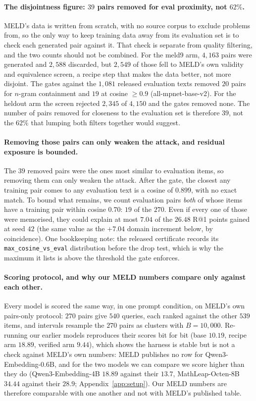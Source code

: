 \paragraph{The disjointness figure: $39$ pairs removed for eval proximity, not $62\%$.}MELD's data is written from scratch, with no source corpus to exclude problems from, so the only way to keep training data away from its evaluation set is to check each generated pair against it. That check is separate from quality filtering, and the two counts should not be combined. For the meld9 arm, $4{,}163$ pairs were generated and $2{,}588$ discarded, but $2{,}549$ of those fell to MELD's own validity and equivalence screen, a recipe step that makes the data better, not more disjoint. The gates against the $1{,}081$ released evaluation texts removed $20$ pairs for $n$-gram containment and $19$ at cosine $\ge 0.9$ (all-mpnet-base-v2). For the heldout arm the screen rejected $2{,}345$ of $4{,}150$ and the gates removed none. The number of pairs removed for closeness to the evaluation set is therefore $39$, not the $62\%$ that lumping both filters together would suggest.

\paragraph{Removing those pairs can only weaken the attack, and residual exposure is bounded.}The $39$ removed pairs were the ones most similar to evaluation items, so removing them can only weaken the attack. After the gate, the closest any training pair comes to any evaluation text is a cosine of $0.899$, with no exact match. To bound what remains, we count evaluation pairs \emph{both} of whose items have a training pair within cosine $0.70$: $19$ of the $270$. Even if every one of those were memorised, they could explain at most $7.04$ of the $26.48$ R@1 points gained at seed $42$ (the same value as the $+7.04$ domain increment below, by coincidence). One bookkeeping note: the released certificate records its \texttt{max\_cosine\_vs\_eval} distribution before the drop test, which is why the maximum it lists is above the threshold the gate enforces.

\paragraph{Scoring protocol, and why our MELD numbers compare only against each other.}Every model is scored the same way, in one prompt condition, on MELD's own pairs-only protocol: $270$ pairs give $540$ queries, each ranked against the other $539$ items, and intervals resample the $270$ pairs as clusters with $B = 10{,}000$. Re-running our earlier models reproduces their scores bit for bit (base $10.19$, recipe arm $18.89$, verified arm $9.44$), which shows the harness is stable but is not a check against MELD's own numbers: MELD publishes no row for Qwen3-Embedding-$0.6$B, and for the two models we can compare we score higher than they do (Qwen3-Embedding-4B $18.89$ against their $13.7$, MathLeap-Octen-8B $34.44$ against their $28.9$; Appendix~\ref{app:setup}). Our MELD numbers are therefore comparable with one another and not with MELD's published table.

